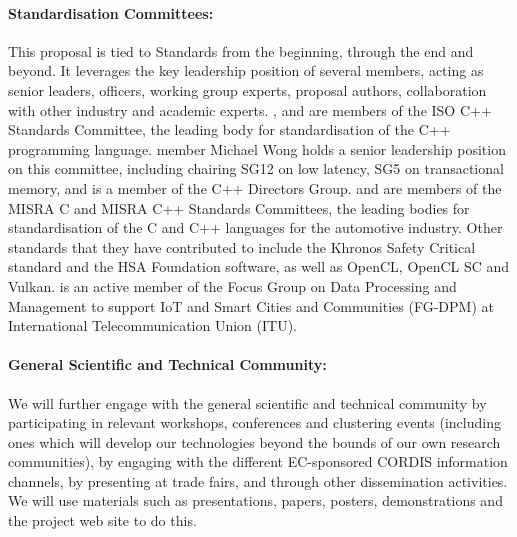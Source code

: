 \documentclass[a4paper,11pt]{article}
\begin{document}
\paragraph{Standardisation Committees:}
This proposal is tied to Standards from the beginning, through the end and beyond. It leverages the key leadership position of several members, acting as senior leaders, officers, working group experts, proposal authors, collaboration with other industry and academic experts.
%
%
\CODEPLAYshort{}, \SAshort{} and \PRshort{} are members of the ISO C++ Standards Committee, the leading body
for standardisation of the C++ programming language. \CODEPLAYshort{} member Michael Wong holds a senior leadership position
on this committee, including chairing SG12 on low latency, SG5 on transactional memory, and is a member of the C++ Directors Group. 
\CODEPLAYshort{} and  \PRshort{} are members of the MISRA C and MISRA C++ Standards Committees, the leading bodies for standardisation of the C and C++ languages for the automotive industry. 
Other standards that they have contributed to include the Khronos Safety Critical standard and the HSA Foundation software, as well as OpenCL, OpenCL SC and Vulkan. 
%
\GOLEMshort{} is an active member of the Focus Group on Data Processing and Management to support IoT and Smart Cities and Communities (FG-DPM) at International Telecommunication Union (ITU).


\paragraph{General Scientific and Technical Community:}
We will further engage with the general scientific and technical community
 by participating in relevant workshops, conferences and clustering events (including ones which
 will develop our technologies beyond the bounds of our own research communities), by engaging with the
 different EC-sponsored CORDIS information channels, by presenting at trade
 fairs, and through other dissemination activities.  We will use materials such as presentations,
 papers,  posters, demonstrations and the project web site to do this.
\end{document}
